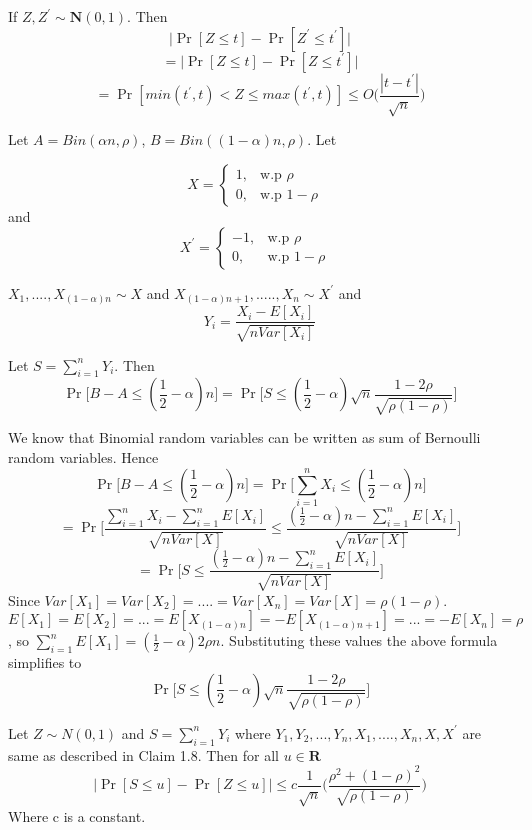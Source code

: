 \documentclass[11pt]{article}
\begin{document}
\ET

\BCM
If $Z,Z^{'} \sim \textbf{N}(0,1)$. Then $$\big| \Pr[Z\leq t] - \Pr[Z^{'} \leq t^{'}] \big|$$ $$= \big| \Pr[Z\leq t] - \Pr[Z \leq t^{'}] \big| $$  $$= \Pr[min(t^{'},t) < Z \leq max(t^{'},t)] \leq  O\Big( \frac{|t-t^{'}|}{\sqrt{n}} \Big)$$

\ECM

\BCM
Let  $A = Bin(\alpha n, \rho)$, $B = Bin((1-\alpha)n, \rho)$. Let 

\begin{equation}
X  =\begin{cases}
1 , & \text{w.p $\rho$ }\\
0 , & \text{w.p $1-\rho$ }
\end{cases}
\end{equation}
and 
\begin{equation}
X^{'}  =\begin{cases}
-1 , & \text{w.p $\rho$ }\\
0 , & \text{w.p $1-\rho$ }
\end{cases}
\end{equation}

$X_1,...., X_{(1-\alpha)n} \sim X$ and $X_{(1-\alpha)n + 1}, ....., X_n \sim X^{'}$ and $$Y_i = \frac{X_i - E[X_i]}{\sqrt{n Var[X_i]}}$$

 Let $S = \sum_{i=1}^{n}Y_i$. Then $$\Pr\bigg[B-A \leq (\frac{1}{2} - \alpha)n\bigg] = \Pr\bigg[S \leq (\frac{1}{2} - \alpha)\sqrt{n} \frac{1-2\rho}{\sqrt{\rho(1-\rho)}}   \bigg]$$
\ECM

\BPF
We know that Binomial random variables can be written as sum of Bernoulli random variables. Hence $$\Pr\bigg[B-A \leq (\frac{1}{2} - \alpha)n\bigg] = \Pr\bigg[\sum_{i=1}^{n} X_i \leq (\frac{1}{2} - \alpha)n\bigg]$$ $$ = \Pr \Bigg[\frac{\sum_{i=1}^{n} X_i - \sum_{i=1}^{n} E[X_i]}{\sqrt{nVar[X]}} \leq \frac{(\frac{1}{2} - \alpha)n - \sum_{i=1}^{n} E[X_i]}{\sqrt{nVar[X]}}\Bigg]$$ $$ = \Pr\Bigg[S \leq \frac{(\frac{1}{2} - \alpha)n - \sum_{i=1}^{n} E[X_i]}{\sqrt{nVar[X]}}\Bigg] $$ Since $Var[X_1]= Var[X_2]= .... = Var[X_n] = Var[X] = \rho(1-\rho)$.  $E[X_1] = E[X_2] = ... = E[X_{(1-\alpha)n}] = -E[X_{(1-\alpha)n + 1}] = ... = -E[X_n] = \rho$, so $\sum_{i=1}^{n} E[X_1] = (\frac{1}{2} - \alpha)2\rho n$. Substituting these values the above formula simplifies to  $$  \Pr\bigg[S \leq (\frac{1}{2} - \alpha)\sqrt{n} \frac{1-2\rho}{\sqrt{\rho(1-\rho)}} \bigg] $$
\EPF

\BCM
Let $Z\sim N(0,1)$ and $S= \sum_{i=1}^{n}Y_i $ where $Y_1, Y_2,..., Y_n, X_1,...., X_n, X, X^{'}$ are same as described in Claim 1.8. Then for all $u\in \mathbf{R}$ $$\big| \Pr[S \leq u] - \Pr[Z \leq u] \big| \leq c \frac{1}{\sqrt{n}} \Big( \frac{\rho^2 + (1-\rho)^2}{\sqrt{\rho(1-\rho)}} \Big)$$ Where c is a constant.
\end{document}
